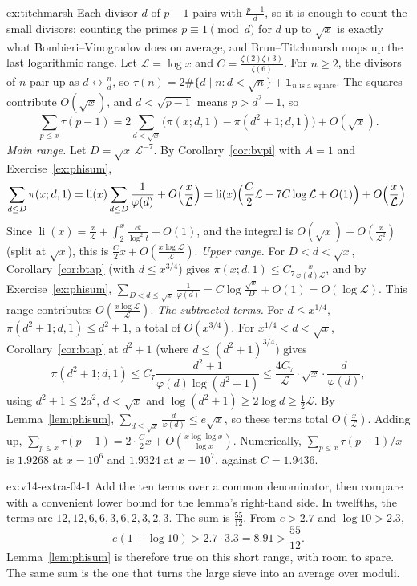 \begin{solution}{ex:titchmarsh}
\idea Each divisor $d$ of $p-1$ pairs with $\frac{p-1}d$, so it is enough to count the small divisors; counting the primes $p\equiv1\pmod d$ for $d$ up to $\sqrt x$ is exactly what Bombieri--Vinogradov does on average, and Brun--Titchmarsh mops up the last logarithmic range.
\writeup Let $\mathcal L=\log x$ and $C=\frac{\zeta(2)\zeta(3)}{\zeta(6)}$. For $n\ge2$, the divisors of $n$ pair up as $d\leftrightarrow\frac nd$, so $\tau(n)=2\#\{d\mid n:d<\sqrt n\}+\mathbf 1_{n\text{ is a square}}$. The squares contribute $O(\sqrt x)$, and $d<\sqrt{p-1}$ means $p>d^2+1$, so
\[
\sum_{p\le x}\tau(p-1)=2\sum_{d<\sqrt x}\bigl(\pi(x;d,1)-\pi(d^2+1;d,1)\bigr)+O(\sqrt x).
\]
\emph{Main range.} Let $D=\sqrt x\,\mathcal L^{-7}$. By Corollary~\ref{cor:bvpi} with $A=1$ and Exercise~\ref{ex:phisum},
\[
\sum_{d\le D}\pi(x;d,1)=\operatorname{li}(x)\sum_{d\le D}\frac1{\varphi(d)}+O\Bigl(\frac x{\mathcal L}\Bigr)=\operatorname{li}(x)\Bigl(\frac C2\mathcal L-7C\log\mathcal L+O(1)\Bigr)+O\Bigl(\frac x{\mathcal L}\Bigr).
\]
Since $\operatorname{li}(x)=\frac x{\mathcal L}+\int_2^x\frac{\dd t}{\log^2t}+O(1)$, and the integral is $O(\sqrt x)+O(\frac x{\mathcal L^2})$ (split at $\sqrt x$), this is $\frac C2x+O(\frac{x\log\mathcal L}{\mathcal L})$.
\emph{Upper range.} For $D<d<\sqrt x$, Corollary~\ref{cor:btap} (with $d\le x^{3/4}$) gives $\pi(x;d,1)\le C_7\frac x{\varphi(d)\mathcal L}$, and by Exercise~\ref{ex:phisum}, $\sum_{D<d\le\sqrt x}\frac1{\varphi(d)}=C\log\frac{\sqrt x}D+O(1)=O(\log\mathcal L)$. This range contributes $O(\frac{x\log\mathcal L}{\mathcal L})$.
\emph{The subtracted terms.} For $d\le x^{1/4}$, $\pi(d^2+1;d,1)\le d^2+1$, a total of $O(x^{3/4})$. For $x^{1/4}<d<\sqrt x$, Corollary~\ref{cor:btap} at $d^2+1$ (where $d\le(d^2+1)^{3/4}$) gives
\[
\pi(d^2+1;d,1)\le C_7\frac{d^2+1}{\varphi(d)\log(d^2+1)}\le\frac{4C_7}{\mathcal L}\cdot\sqrt x\cdot\frac d{\varphi(d)},
\]
using $d^2+1\le2d^2$, $d<\sqrt x$ and $\log(d^2+1)\ge2\log d\ge\frac12\mathcal L$. By Lemma~\ref{lem:phisum}, $\sum_{d\le\sqrt x}\frac d{\varphi(d)}\le e\sqrt x$, so these terms total $O(\frac x{\mathcal L})$.
Adding up, $\sum_{p\le x}\tau(p-1)=2\cdot\frac C2x+O(\frac{x\log\log x}{\log x})$. Numerically, $\sum_{p\le x}\tau(p-1)/x$ is $1.9268$ at $x=10^6$ and $1.9324$ at $x=10^7$, against $C=1.9436$.
\end{solution}

\begin{solution}{ex:v14-extra-04-1}
\idea Add the ten terms over a common denominator, then compare with a convenient lower bound for the lemma's right-hand side.
\writeup In twelfths, the terms are $12,12,6,6,3,6,2,3,2,3$. The sum is $\frac{55}{12}$. From $e>2.7$ and $\log10>2.3$,
\[
e(1+\log10)>2.7\cdot3.3=8.91>\frac{55}{12}.
\]
Lemma~\ref{lem:phisum} is therefore true on this short range, with room to spare. The same sum is the one that turns the large sieve into an average over moduli.
\end{solution}

